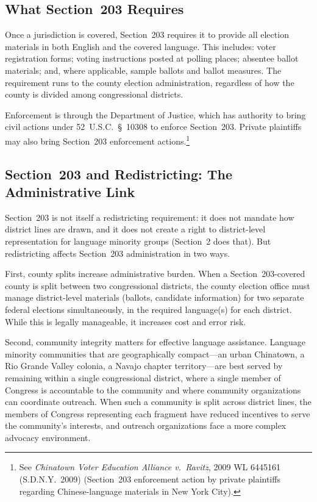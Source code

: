 \subsection{What Section~203 Requires}

Once a jurisdiction is covered, Section~203 requires it to provide all
election materials in both English and the covered language. This includes:
voter registration forms; voting instructions posted at polling places;
absentee ballot materials; and, where applicable, sample ballots and
ballot measures. The requirement runs to the county election administration,
regardless of how the county is divided among congressional districts.

Enforcement is through the Department of Justice, which has authority to
bring civil actions under 52~U.S.C.~\S~10308 to enforce Section~203.
Private plaintiffs may also bring Section~203 enforcement actions.\footnote{
See \textit{Chinatown Voter Education Alliance v.\ Ravitz}, 2009 WL 6445161
(S.D.N.Y.\ 2009) (Section~203 enforcement action by private plaintiffs
regarding Chinese-language materials in New York City).}

\subsection{Section~203 and Redistricting: The Administrative Link}

Section~203 is not itself a redistricting requirement: it does not mandate
how district lines are drawn, and it does not create a right to
district-level representation for language minority groups (Section~2
does that). But redistricting affects Section~203 administration in
two ways.

First, county splits increase administrative burden. When a
Section~203-covered county is split between two congressional districts,
the county election office must manage district-level materials (ballots,
candidate information) for two separate federal elections simultaneously,
in the required language(s) for each district. While this is legally
manageable, it increases cost and error risk.

Second, community integrity matters for effective language assistance.
Language minority communities that are geographically compact---an
urban Chinatown, a Rio Grande Valley colonia, a Navajo chapter
territory---are best served by remaining within a single congressional
district, where a single member of Congress is accountable to the community
and where community organizations can coordinate outreach. When such a
community is split across district lines, the members of Congress
representing each fragment have reduced incentives to serve the community's
interests, and outreach organizations face a more complex advocacy environment.
